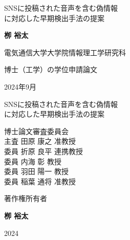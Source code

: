 \documentclass[a4paper,twoside,12pt,uplatex]{jsreport}    %
\theoremstyle{definition}%
\begin{document}
\baselineskip 22pt

\begin{titlepage}
  \Large
  \begin{center}
   {\LARGE     %
      SNSに投稿された音声を含む偽情報\\に対応した早期検出手法の提案
    }
  \end{center}
  \vspace{60mm}
  \centerline{\bf 栁 裕太}
  \vspace{20mm}
  \centerline{電気通信大学大学院情報理工学研究科}
  \centerline{博士（工学）の学位申請論文}
  \vspace{25mm}
  \centerline{\large 2024年9月}


  \cleardoublepage
  \begin{center}
   {\LARGE     %
      SNSに投稿された音声を含む偽情報\\に対応した早期検出手法の提案
    }
  \end{center}
  \vspace{60mm}
  \hspace{50mm}博士論文審査委員会\\
  \hspace{60mm}主査 \hspace{6mm} 田原 康之 \hspace{3mm} 准教授\\
  \hspace{60mm}委員 \hspace{6mm} 折原 良平 \hspace{3mm} 連携教授\\
  \hspace{60mm}委員 \hspace{6mm} 内海 彰 \hspace{3mm} 教授\\
  \hspace{60mm}委員 \hspace{6mm} 羽田 陽一 \hspace{3mm} 教授\\
  \hspace{60mm}委員 \hspace{6mm} 稲葉 通将 \hspace{3mm} 准教授\\
  \thispagestyle{empty}
  \cleardoublepage
  \vspace*{70mm}
  \centerline{\LARGE 著作権所有者}
  \vspace{20mm}
  \centerline{\bf 栁 裕太}
  \vspace{10mm}
  \centerline{\large 2024}
  \thispagestyle{empty}
\end{titlepage}
\thispagestyle{empty}

\end{document}
